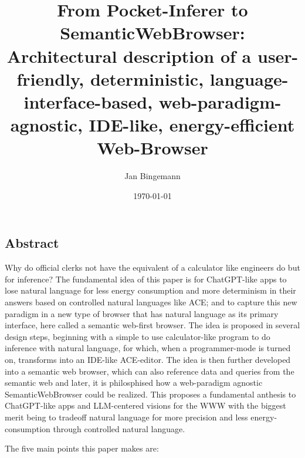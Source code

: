\documentclass[12pt,a4paper]{article}
\title{From Pocket-Inferer to SemanticWebBrowser:\\Architectural description of a user-friendly, deterministic, language-interface-based, web-paradigm-agnostic, IDE-like, energy-efficient Web-Browser}
\author{Jan Bingemann}
\date{\today}
\begin{document}
\maketitle

\newpage
\tableofcontents
\newpage

\subsection*{Abstract}

Why do official clerks not have the equivalent of a calculator like engineers do but for inference?
The fundamental idea of this paper is for ChatGPT-like apps to lose natural language for less energy consumption and more determinism in their answers based on controlled natural languages like ACE; and to capture this new paradigm in a new type of browser that has natural language as its primary interface, here called a semantic web-first browser.
The idea is proposed in several design steps, beginning with a simple to use calculator-like program to do inference with natural language, for which, when a programmer-mode is turned on, transforms into an IDE-like ACE-editor.
The idea is then further developed into a semantic web browser, which can also reference data and queries from the semantic web and later, it is philosphised how a web-paradigm agnostic SemanticWebBrowser could be realized.
This proposes a fundamental anthesis to ChatGPT-like apps and LLM-centered visions for the WWW with the biggest merit being to tradeoff natural language for more precision and less energy-consumption through controlled natural language.


The five main points this paper makes are:
\end{document}
